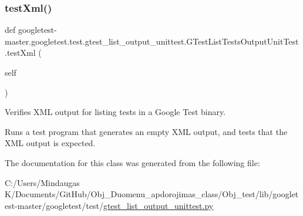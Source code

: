 \subsubsection{\texorpdfstring{testXml()}{testXml()}}
{\footnotesize\ttfamily def googletest-\/master.\+googletest.\+test.\+gtest\+\_\+list\+\_\+output\+\_\+unittest.\+G\+Test\+List\+Tests\+Output\+Unit\+Test.\+test\+Xml (\begin{DoxyParamCaption}\item[{}]{self }\end{DoxyParamCaption})}

\begin{DoxyVerb}Verifies XML output for listing tests in a Google Test binary.

Runs a test program that generates an empty XML output, and
tests that the XML output is expected.
\end{DoxyVerb}
 

The documentation for this class was generated from the following file\+:\begin{DoxyCompactItemize}
\item 
C\+:/\+Users/\+Mindaugas K/\+Documents/\+Git\+Hub/\+Obj\+\_\+\+Duomenu\+\_\+apdorojimas\+\_\+class/\+Obj\+\_\+test/lib/googletest-\/master/googletest/test/\mbox{\hyperlink{_obj__test_2lib_2googletest-master_2googletest_2test_2gtest__list__output__unittest_8py}{gtest\+\_\+list\+\_\+output\+\_\+unittest.\+py}}\end{DoxyCompactItemize}
